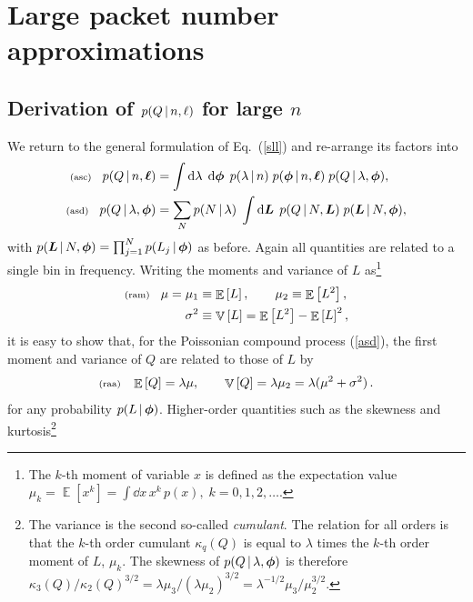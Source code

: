 \documentclass[11pt]{article}
\newcommand{\fredmargin}[1]{\todo[color=orange!40]{#1}} %
\newcommand{\lleq}[1]{\label{#1} }
\renewcommand{\lleq}[1]{\label{#1} {\scriptstyle {\rm (#1)}} \hspace*{2ex} }
\newcommand{\cond}{\,|\,}
\newcommand{\refeq}[1]{Eq.~(\ref{#1})}
\DeclareMathOperator{\Expect}{\mathbb{E}}
\newcommand{\expect}[1]{\Expect\left[#1\right]}
\newcommand{\Lum}{L}
\newcommand{\rmdx}[1]{\dd{#1}} %
\DeclareMathOperator{\Variance}{\mathbb{V}}
\newcommand{\variance}[1]{\Variance\left[#1\right]}
\begin{document}
\section{Large packet number approximations} \label{sec:asymptotic}

\subsection{Derivation of $p(Q\,|\,n,\boldmath{\ell})$ for large $n$}

We return to the general formulation of \refeq{sll} and re-arrange its
factors into
\begin{align}
  \lleq{asc}
  p(Q\cond n,\bml)
  &= \int \rmdx{\lambda}\; \rmdx{\bmphi}\;
    p(\lambda\cond n)\;
    p(\bmphi\cond n,\bml)\;
    p(Q\cond \lambda,\bmphi), \\
  \lleq{asd}
  p(Q\cond \lambda,\bmphi)
  &= \sum_N
    p(N\cond \lambda)\;
    \int \rmdx{\bmL}\;
    p(Q\cond N,\bmL)\;
    p(\bmL\cond N,\bmphi),
\end{align}
with $p(\bmL\cond N,\bmphi) = \prod_{j=1}^N p(L_j\cond\bmphi)$ as
before. Again all quantities are related to a single bin in frequency.
Writing the moments and variance of $L$ as\footnote{The $k$-th moment
  of variable $x$ is defined as the expectation value $\mu_k =
  \expect{x^k} = \int \rmdx{x}\,x^k\,p(x),\; k = 0,1,2,\ldots$.} %
\begin{align}
  \lleq{ram}
  \mu =  \mu_1 &\equiv \expect{\Lum}, \qquad
  \mu_2 \equiv \expect{\Lum^2}, \\
  \sigma^2 &\equiv \variance{\Lum}
  = \expect{\Lum^2} - \expect{\Lum}^2,
\end{align}
it is easy to show that, for the Poissonian compound process
(\ref{asd}), the first moment and variance of $Q$ are related to those
of $L$ by
\fredmargin{citation} %
\begin{align}
  \lleq{raa}
  \expect{Q} = \lambda \mu, \qquad
  \variance{Q} = \lambda \mu_2 = \lambda (\mu^2 + \sigma^2) \,.
\end{align}
for any probability $p(L\cond\bmphi)$.
%
Higher-order quantities such as the skewness and kurtosis\footnote{
  The variance is the second so-called \textit{cumulant}. The relation
  for all orders is that the $k$-th order cumulant $\kappa_q(Q)$ is
  equal to $\lambda$ times the $k$-th order moment of $L$,
  $\mu_k$. The skewness of $p(Q\cond \lambda,\bmphi)$ is therefore
  $\kappa_3(Q)/\kappa_2(Q)^{3/2} = \lambda \mu_3/(\lambda \mu_2)^{3/2}
  = \lambda^{-1/2} \mu_3/\mu_2^{3/2}$.}  %
\end{document}
